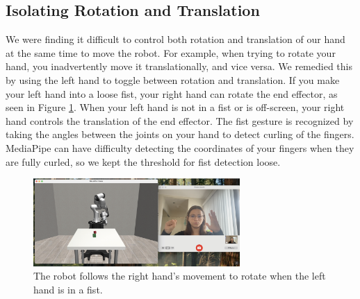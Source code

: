 \documentclass{article}
\begin{document}
\subsection{Isolating Rotation and Translation}
We were finding it difficult to control both rotation and translation of our
hand at the same time to move the robot. For example, when trying to rotate
your hand, you inadvertently move it translationally, and vice versa. We
remedied this by using the left hand to toggle between rotation and
translation. If you make your left hand into a loose fist, your right hand can
rotate the end effector, as seen in Figure \ref{fig:fist-rotation}. When your
left hand is not in a fist or is off-screen, your right hand controls the
translation of the end effector. The fist gesture is recognized by taking the
angles between the joints on your hand to detect curling of the fingers.
MediaPipe can have difficulty detecting the coordinates of your fingers when
they are fully curled, so we kept the threshold for fist detection loose. 
\begin{figure}[H]
  \centering
  \includegraphics[width=0.7\textwidth]{fist-rotation.png}
  \caption{The robot follows the right hand's movement to rotate when the left hand is in a fist. }
  \label{fig:fist-rotation}
\end{figure}

\end{document}
